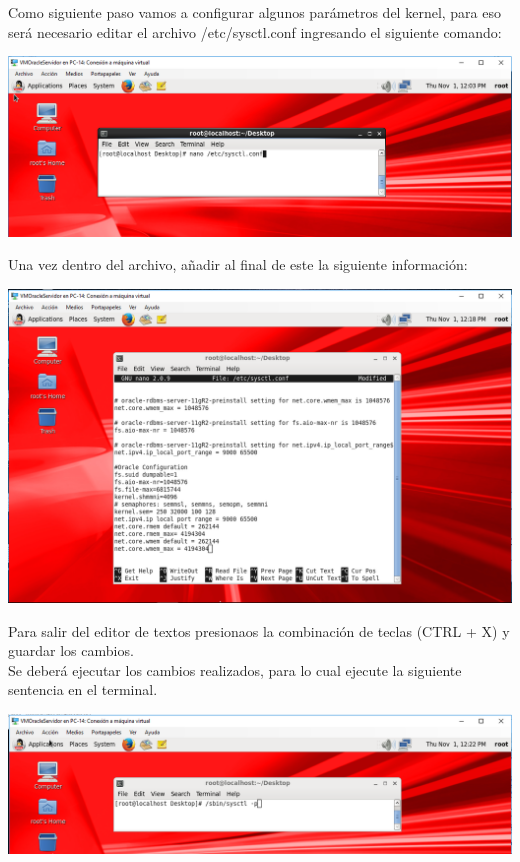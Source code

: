 \newpage

Como siguiente paso vamos a configurar algunos parámetros del kernel, para eso será necesario editar el archivo /etc/sysctl.conf ingresando el siguiente comando:
\begin{center}
	\includegraphics[width=14.35cm]{./Imagenes/43} 
\end{center} 

\vspace{\baselineskip}

Una vez dentro del archivo, añadir al final de este la siguiente información:
\begin{center}
	\includegraphics[width=15cm]{./Imagenes/44} 
\end{center} 

\vspace{\baselineskip}

Para salir del editor de textos presionaos la combinación de teclas (CTRL + X) y guardar los cambios. \\
Se deberá ejecutar los cambios realizados, para lo cual ejecute la siguiente sentencia en el terminal.
\begin{center}
	\includegraphics[width=15cm]{./Imagenes/45} 
\end{center} 

